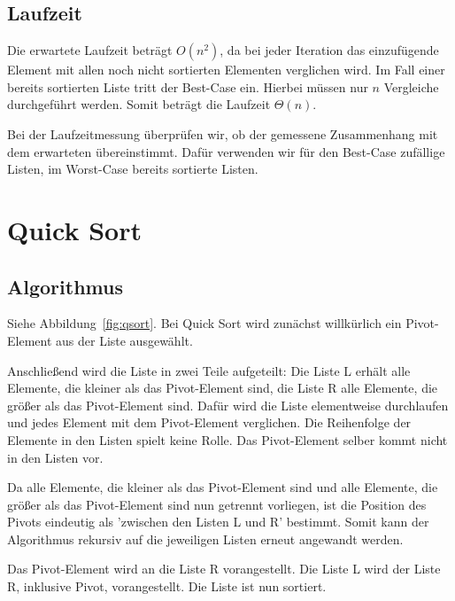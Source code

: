 \documentclass[11pt]{article}
\begin{document}
    \subsection{Laufzeit}\label{subsec:Ilaufzeit}
    Die erwartete Laufzeit beträgt \(O(n^2)\), da bei jeder Iteration das
    einzufügende Element mit allen noch nicht sortierten Elementen verglichen
    wird.
    Im Fall einer bereits sortierten Liste tritt der Best-Case ein.
    Hierbei müssen nur \(n\) Vergleiche durchgeführt werden.
    Somit beträgt die Laufzeit \(\Theta(n)\).

    Bei der Laufzeitmessung überprüfen wir, ob der gemessene Zusammenhang mit
    dem erwarteten übereinstimmt.
    Dafür verwenden wir für den Best-Case zufällige Listen, im Worst-Case
    bereits sortierte Listen.


    \section{Quick Sort}\label{sec:quick-sort}

    \subsection{Algorithmus}\label{subsec:Qalgorithmus}
    Siehe Abbildung~\ref{fig:qsort}.
    Bei Quick Sort wird zunächst willkürlich ein Pivot-Element aus der Liste
    ausgewählt.

    Anschließend wird die Liste in zwei Teile aufgeteilt: Die Liste L erhält
    alle Elemente, die kleiner als das Pivot-Element sind, die Liste R alle
    Elemente, die größer als das Pivot-Element sind.
    Dafür wird die Liste elementweise durchlaufen und jedes Element mit dem
    Pivot-Element verglichen.
    Die Reihenfolge der Elemente in den Listen spielt keine Rolle.
    Das Pivot-Element selber kommt nicht in den Listen vor.

    Da alle Elemente, die kleiner als das Pivot-Element sind und alle Elemente,
    die größer als das Pivot-Element sind nun getrennt vorliegen, ist die
    Position des Pivots eindeutig als 'zwischen den Listen L und R' bestimmt.
    Somit kann der Algorithmus rekursiv auf die jeweiligen Listen erneut
    angewandt werden.

    Das Pivot-Element wird an die Liste R vorangestellt.
    Die Liste L wird der Liste R, inklusive Pivot, vorangestellt.
    Die Liste ist nun sortiert.\\
\end{document}
